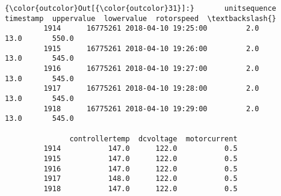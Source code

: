 \documentclass[11pt]{article}
\begin{document}
\begin{Verbatim}[commandchars=\\\{\}]
{\color{outcolor}Out[{\color{outcolor}31}]:}       unitsequence           timestamp  uppervalue  lowervalue  rotorspeed  \textbackslash{}
         1914      16775261 2018-04-10 19:25:00         2.0        13.0       550.0   
         1915      16775261 2018-04-10 19:26:00         2.0        13.0       545.0   
         1916      16775261 2018-04-10 19:27:00         2.0        13.0       545.0   
         1917      16775261 2018-04-10 19:28:00         2.0        13.0       545.0   
         1918      16775261 2018-04-10 19:29:00         2.0        13.0       545.0   
         
               controllertemp  dcvoltage  motorcurrent  
         1914           147.0      122.0           0.5  
         1915           147.0      122.0           0.5  
         1916           147.0      122.0           0.5  
         1917           148.0      122.0           0.5  
         1918           147.0      122.0           0.5  
\end{Verbatim}
            
\end{document}
